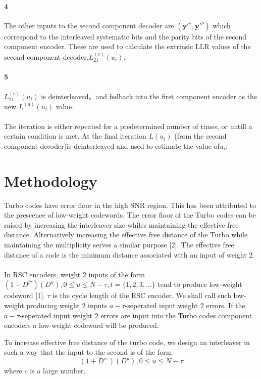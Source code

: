 \documentclass[20 pts]{article}
\begin{document}
\paragraph{4}
The other inputs to the second component decoder are $({\boldsymbol{y}'}^s,{\boldsymbol{y}'}^p)$ which
correspond to the interleaved systematic bits and the parity bits of the second component
encoder. These are used to calculate the extrinsic LLR values 
of the second component decoder,$L_{21}^{(e)}(u_i)$.
\paragraph{5}
$L_{21}^{(e)}(u_i)$ is deinterleaved、and fedback into the first component encoder as the new $L^{(a)}(u_i)$ value.
\paragraph{}
The iteration is either repeated for a predetermined number of times, or untill a certain condition is met. At the final iteration $L(u_i)$ (from the second component decoder)is deinterleaved and used to estimate the value of$u_i$.


\section{Methodology}
Turbo codes have error floor in the high SNR region. This has been attributed to the 
prescence of low-weight codewords. The error floor of the Turbo codes can be raised
 by increasing the interleaver size whiles maintaining the effective free distance. 
 Alternatively increasing the effective free distance of the Turbo while maintaining the 
 multiplicity serves a similar purpose [2]. The effective free distance of a code is the
  minimum distance associated with an input of weight 2. 
\paragraph{}
In RSC encoders, weight 2 inputs of the form $(1+D^{t\tau})(D^u) ,0\leq u\leq N-\tau, t=\{1,2,3,...\}$
 tend
 to produce low-weight codeword [1]. $\tau$ is the cycle length of the RSC encoder. 
 We shall call such low-weight producing weight 2 inputs $a-\tau$-seperated input 
 weight 2 errors. If the $a-\tau$-seperated input weight 2 errors are input into the 
 Turbo codes component encoders a low-weight codeword will be produced. 

To increase effective free distance of the turbo code, we design an interleaver in such 
a way that the input to the second is of the form 
\begin{equation}
(1+D^{c\tau})(D^u) ,0\leq u\leq N-\tau
\label{one}
\end{equation}
where $c$ is a large number.
\end{document}
